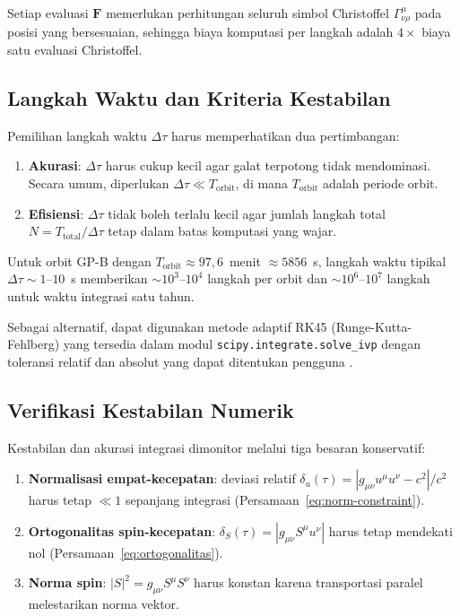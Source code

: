 Setiap evaluasi $\mathbf{F}$ memerlukan perhitungan seluruh
simbol Christoffel $\Gamma^\mu_{\nu\rho}$ pada posisi yang bersesuaian,
sehingga biaya komputasi per langkah adalah $4 \times$
biaya satu evaluasi Christoffel.


\subsection{Langkah Waktu dan Kriteria Kestabilan}
\label{subsec:step-size}

Pemilihan langkah waktu $\Delta\tau$ harus memperhatikan
dua pertimbangan:
\begin{enumerate}
    \item \textbf{Akurasi}: $\Delta\tau$ harus cukup kecil agar galat terpotong
          tidak mendominasi. Secara umum, diperlukan
          $\Delta\tau \ll T_{\text{orbit}}$, di mana $T_{\text{orbit}}$
          adalah periode orbit.
    \item \textbf{Efisiensi}: $\Delta\tau$ tidak boleh terlalu kecil
          agar jumlah langkah total $N = T_{\text{total}}/\Delta\tau$
          tetap dalam batas komputasi yang wajar.
\end{enumerate}

Untuk orbit GP-B dengan $T_{\text{orbit}} \approx 97{,}6$~menit
$\approx 5856$~s, langkah waktu tipikal $\Delta\tau \sim 1$--$10$~s
memberikan $\sim 10^3$--$10^4$ langkah per orbit dan
$\sim 10^6$--$10^7$ langkah untuk waktu integrasi satu tahun.

Sebagai alternatif, dapat digunakan metode adaptif RK45
(Runge-Kutta-Fehlberg) yang tersedia dalam modul
\texttt{scipy.integrate.solve\_ivp} dengan toleransi relatif dan absolut
yang dapat ditentukan pengguna \parencite{SciPy2020}.


\subsection{Verifikasi Kestabilan Numerik}
\label{subsec:verifikasi-kestabilan}

Kestabilan dan akurasi integrasi dimonitor melalui tiga besaran konservatif:
\begin{enumerate}
    \item \textbf{Normalisasi empat-kecepatan}:
    deviasi relatif $\delta_u(\tau) = |g_{\mu\nu} u^\mu u^\nu - c^2|/c^2$
    harus tetap $\ll 1$ sepanjang integrasi
    (Persamaan~\ref{eq:norm-constraint}).

    \item \textbf{Ortogonalitas spin-kecepatan}:
    $\delta_S(\tau) = |g_{\mu\nu} S^\mu u^\nu|$
    harus tetap mendekati nol
    (Persamaan~\ref{eq:ortogonalitas}).

    \item \textbf{Norma spin}:
    $|S|^2 = g_{\mu\nu} S^\mu S^\nu$ harus konstan
    karena transportasi paralel melestarikan norma vektor.
\end{enumerate}


